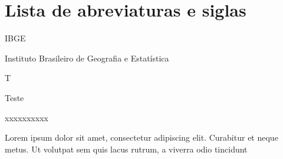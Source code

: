 \newcommand\siglaLargura{10ex} %
\newcommand\siglaGap{1ex} %
\newcommand\nomeSiglaLargura{\dimexpr\linewidth-\siglaLargura-\siglaGap\relax}
\newcommand\sigla[2]{\noindent\parbox[t]{\siglaLargura}{#1\strut}%
  \hspace{\siglaGap}%
  \parbox[t]{\nomeSiglaLargura}{#2\strut}}

\chapter*{Lista de abreviaturas e siglas}

\sigla{IBGE}{Instituto Brasileiro de Geografia e Estatística}

\sigla{T}{Teste}

\sigla{xxxxxxxxxx}{Lorem ipsum dolor sit amet, consectetur adipiscing elit. Curabitur et neque metus. Ut volutpat sem quis lacus rutrum, a viverra odio tincidunt}